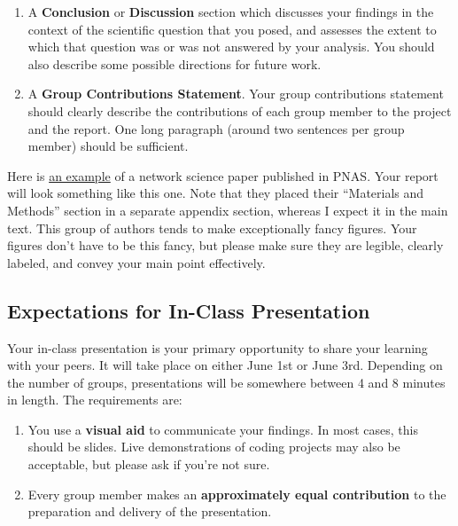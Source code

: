 \documentclass{hw}
\begin{document}
\begin{enumerate}
\begin{itemize}
    \end{itemize}
    \item A \textbf{Conclusion} or \textbf{Discussion} section which discusses your findings in the context of the scientific question that you posed, and assesses the extent to which that question was or was not answered by your analysis.
    You should also describe some possible directions for future work.  
    \item A \textbf{Group Contributions Statement}. 
    Your group contributions statement should clearly describe the contributions of each group member to the project and the report. 
    One long paragraph (around two sentences per group member) should be sufficient. 
\end{enumerate}

Here is \href{https://www.pnas.org/doi/pdf/10.1073/pnas.1018985108}{an example} of a network science paper published in PNAS. 
Your report will look something like this one. 
Note that they placed their ``Materials and Methods'' section in a separate appendix section, whereas I expect it in the main text. 
This group of authors tends to make exceptionally fancy figures. 
Your figures don't have to be this fancy, but please make sure they are legible, clearly labeled, and convey your main point effectively. 


\pagebreak

\subsection*{Expectations for In-Class Presentation}

Your in-class presentation is your primary opportunity to share your learning with your peers. 
It will take place on either June 1st or June 3rd. 
Depending on the number of groups, presentations will be somewhere between 4 and 8 minutes in length.
The requirements are: 
\begin{enumerate}
    \item You use a \textbf{visual aid} to communicate your findings. In most cases, this should be slides. 
    Live demonstrations of coding projects may also be acceptable, but please ask if you're not sure. 
    \item Every group member makes an \textbf{approximately equal contribution} to the preparation and delivery of the presentation. 
\end{enumerate}
\end{document}
